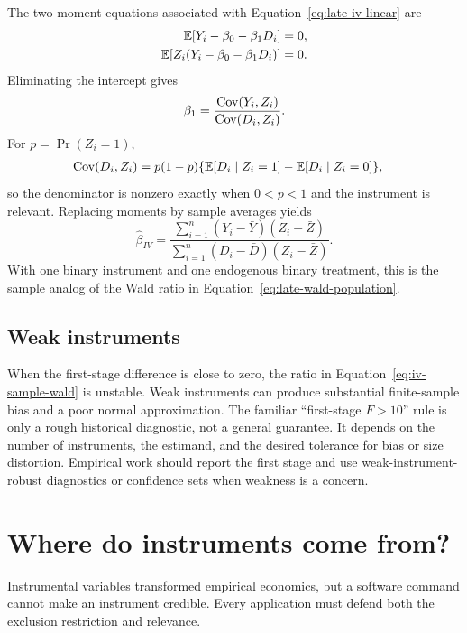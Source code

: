 The two moment equations associated with
Equation~\eqref{eq:late-iv-linear} are
\begin{align}
  \mathbb{E}[Y_i-\beta_0-\beta_1D_i]&=0,\label{eq:iv-moment-one}\\
  \mathbb{E}[Z_i(Y_i-\beta_0-\beta_1D_i)]&=0.\label{eq:iv-moment-two}
\end{align}
Eliminating the intercept gives
\begin{equation}
  \beta_1=\frac{\operatorname{Cov}(Y_i,Z_i)}{\operatorname{Cov}(D_i,Z_i)}.
  \label{eq:iv-covariance-ratio}
\end{equation}
For $p=\Pr(Z_i=1)$,
\begin{align*}
  \operatorname{Cov}(D_i,Z_i)
  &=p(1-p)\{\mathbb{E}[D_i\mid Z_i=1]-\mathbb{E}[D_i\mid Z_i=0]\},
\end{align*}
so the denominator is nonzero exactly when $0<p<1$ and the instrument is
relevant.  Replacing moments by sample averages yields
\begin{equation}
  \widehat\beta_{IV}=
  \frac{\sum_{i=1}^n(Y_i-\bar Y)(Z_i-\bar Z)}
       {\sum_{i=1}^n(D_i-\bar D)(Z_i-\bar Z)}.
  \label{eq:iv-sample-wald}
\end{equation}
With one binary instrument and one endogenous binary treatment, this is the
sample analog of the Wald ratio in
Equation~\eqref{eq:late-wald-population}.

\subsection{Weak instruments}

When the first-stage difference is close to zero, the ratio in
Equation~\eqref{eq:iv-sample-wald} is unstable.  Weak instruments can produce
substantial finite-sample bias and a poor normal approximation.  The familiar
``first-stage $F>10$'' rule is only a rough historical diagnostic, not a general
guarantee.  It depends on the number of instruments, the estimand, and the
desired tolerance for bias or size distortion.  Empirical work should report
the first stage and use weak-instrument-robust diagnostics or confidence sets
when weakness is a concern.

\section{Where do instruments come from?}
\label{sec:late-applications}

Instrumental variables transformed empirical economics, but a software command
cannot make an instrument credible.  Every application must defend both the
exclusion restriction and relevance.

